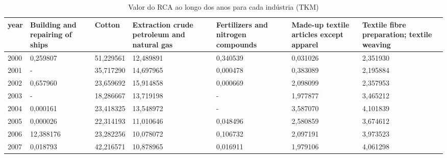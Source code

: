 \begin{table}
\centering
\caption{Valor do RCA ao longo dos anos para cada indústria (TKM)}
\begin{tabular}{p{1cm}p{2cm}p{2cm}p{2cm}p{2cm}p{2cm}p{2cm}}
\toprule
 year &  Building and repairing of ships &    Cotton &  Extraction crude petroleum and natural gas &  Fertilizers and nitrogen compounds &  Made-up textile articles except apparel &  Textile fibre preparation; textile weaving \\
\midrule
 2000 &                         0,259807 & 51,229561 &                                   12,489891 &                            0,340539 &                                 0,031026 &                                    2,351930 \\
 2001 &                                - & 35,717290 &                                   14,697965 &                            0,000478 &                                 0,383089 &                                    2,195884 \\
 2002 &                         0,657960 & 23,659692 &                                   15,914858 &                            0,000669 &                                 2,098099 &                                    2,357953 \\
 2003 &                                - & 18,286667 &                                   13,719198 &                                   - &                                 1,977877 &                                    3,465212 \\
 2004 &                         0,000161 & 23,418325 &                                   13,548972 &                                   - &                                 3,587070 &                                    4,101839 \\
 2005 &                         0,000026 & 22,314193 &                                   11,010646 &                            0,048496 &                                 2,580859 &                                    3,674612 \\
 2006 &                        12,388176 & 23,282256 &                                   10,078072 &                            0,106732 &                                 2,097191 &                                    3,973523 \\
 2007 &                         0,018793 & 42,216571 &                                   10,878965 &                            0,016911 &                                 1,979106 &                                    4,061298 \\

\end{tabular}
\end{table}
